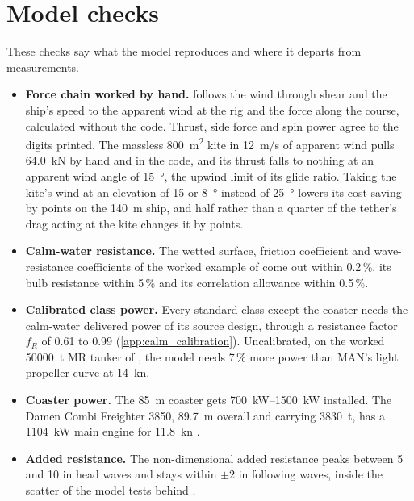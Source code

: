 \section{Model checks}
\label{sec:checks}

These checks say what the model reproduces and where it departs from measurements.

\begin{itemize}
\item \textbf{Force chain worked by hand.}  follows the wind through shear and the ship's speed to the apparent wind at the rig and the force along the course, calculated without the code. Thrust, side force and spin power agree to the digits printed. The massless \SI{800}{m^2} kite in \SI{12}{m/s} of apparent wind pulls \SI{64.0}{kN} by hand and in the code, and its thrust falls to nothing at an apparent wind angle of \SI{15}{\degree}, the upwind limit of its glide ratio. Taking the kite's wind at an elevation of 15 or \SI{8}{\degree} instead of \SI{25}{\degree} lowers its cost saving by  points on the \SI{140}{m} ship, and half rather than a quarter of the tether's drag acting at the kite changes it by  points.
\item \textbf{Calm-water resistance.} The wetted surface, friction coefficient and wave-resistance coefficients of the worked example of \citet{holtrop1982} come out within 0.2\,\%, its bulb resistance within 5\,\% and its correlation allowance within 0.5\,\%.
\item \textbf{Calibrated class power.} Every standard class except the coaster needs the calm-water delivered power of its source design, through a resistance factor $f_R$ of 0.61 to 0.99 (\cref{app:calm_calibration}). Uncalibrated, on the worked \num{50000}~t MR tanker of \citet{man2011}, the model needs 7\,\% more power than MAN's light propeller curve at \SI{14}{kn}.
\item \textbf{Coaster power.} The \SI{85}{m} coaster gets \SIrange{700}{1500}{kW} installed. The Damen Combi Freighter 3850, \SI{89.7}{m} overall and carrying \num{3830}~t, has a \SI{1104}{kW} main engine for \SI{11.8}{kn} \citep{maritimeexecutive2022}.
\item \textbf{Added resistance.} The non-dimensional added resistance peaks between 5 and 10 in head waves and stays within $\pm2$ in following waves, inside the scatter of the model tests behind \citet{mittendorf2022}.

\end{itemize}
